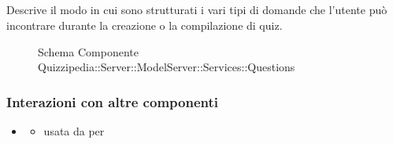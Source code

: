 \subsection{}
Descrive il modo in cui sono strutturati i vari tipi di domande che l'utente può incontrare durante la creazione o la compilazione di quiz.
\begin{figure}[H]
\centering
\noindent{}
\caption[Schema Componente Quizzipedia::Server::ModelServer::Services::Questions]{Schema Componente Quizzipedia::Server::ModelServer::Services::Questions}
\end{figure}
\subsubsection{Interazioni con altre componenti}
\begin{itemize}
\item {}
\begin{itemize}
\item usata da  per 
\end{itemize}
\end{itemize}
